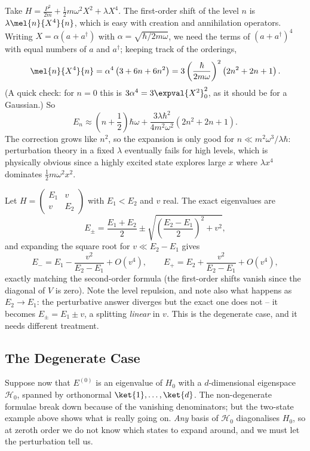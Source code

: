 \begin{example}
    Take $H = \frac{P^2}{2m} + \frac12 m\omega^2X^2 + \lambda X^4$. The first-order shift of the level $n$ is $\lambda\mel{n}{X^4}{n}$, which is easy with creation and annihilation operators. Writing $X = \alpha(a+a^\dagger)$ with $\alpha = \sqrt{\hbar/2m\omega}$, we need the terms of $(a+a^\dagger)^4$ with equal numbers of $a$ and $a^\dagger$; keeping track of the orderings,
    $$
    \mel{n}{X^4}{n} = \alpha^4\left( 3 + 6n + 6n^2 \right) = 3\left(\frac{\hbar}{2m\omega}\right)^2\left( 2n^2+2n+1 \right).
    $$
    (A quick check: for $n=0$ this is $3\alpha^4 = 3\expval{X^2}_0^2$, as it should be for a Gaussian.) So
    $$
    E_n \approx \left( n + \frac12 \right)\hbar\omega + \frac{3\lambda\hbar^2}{4m^2\omega^2}\left(2n^2+2n+1\right).
    $$
    The correction grows like $n^2$, so the expansion is only good for $n \ll m^2\omega^3/\lambda\hbar$: perturbation theory in a fixed $\lambda$ eventually fails for high levels, which is physically obvious since a highly excited state explores large $x$ where $\lambda x^4$ dominates $\frac12 m\omega^2x^2$.
\end{example}

\begin{example}
    Let $H = \begin{pmatrix} E_1 & v \\ v & E_2\end{pmatrix}$ with $E_1 < E_2$ and $v$ real. The exact eigenvalues are
    $$
    E_\pm = \frac{E_1+E_2}{2} \pm \sqrt{ \left(\frac{E_2-E_1}{2}\right)^2 + v^2 },
    $$
    and expanding the square root for $v \ll E_2 - E_1$ gives
    $$
    E_- = E_1 - \frac{v^2}{E_2 - E_1} + O(v^4), \qquad E_+ = E_2 + \frac{v^2}{E_2-E_1}+O(v^4),
    $$
    exactly matching the second-order formula (the first-order shifts vanish since the diagonal of $V$ is zero). Note the level repulsion, and note also what happens as $E_2 \to E_1$: the perturbative answer diverges but the exact one does not -- it becomes $E_\pm = E_1 \pm v$, a splitting \emph{linear} in $v$. This is the degenerate case, and it needs different treatment.
\end{example}

\subsection{The Degenerate Case}

Suppose now that $E^{(0)}$ is an eigenvalue of $H_0$ with a $d$-dimensional eigenspace $\mathcal{H}_0$, spanned by orthonormal $\ket{1},\dots,\ket{d}$. The non-degenerate formulae break down because of the vanishing denominators; but the two-state example above shows what is really going on. \emph{Any} basis of $\mathcal{H}_0$ diagonalises $H_0$, so at zeroth order we do not know which states to expand around, and we must let the perturbation tell us.

